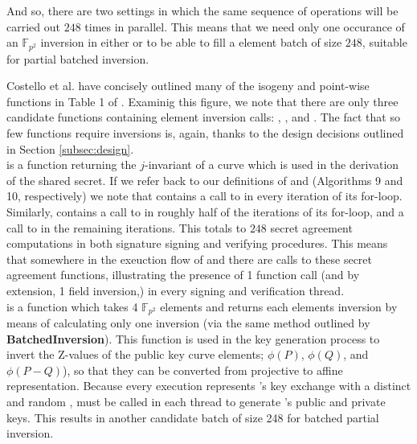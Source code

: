 And so, there are two settings in which the same sequence of operations will be carried out $248$ times in parallel. This means that we need only one occurance of an $\mathbb{F}_{p^2}$ inversion in either  or  to be able to fill a element batch of size $248$, suitable for partial batched inversion.

Costello et al. have concisely outlined many of the \sidh isogeny and point-wise functions in Table 1 of \cite{effalg}. Examinig this figure, we note that there are only three candidate functions containing element inversion calls: , , and . The fact that so few functions require inversions is, again, thanks to the design decisions outlined in Section \ref{subsec:design}.\\

\noindent
{} is a function returning the $j$-invariant of a curve which is used in the derivation of the shared secret. If we refer back to our definitions of  and  (Algorithms 9 and 10, respectively) we note that  contains a call to  in every iteration of its for-loop. Similarly,  contains a call to  in roughly half of the iterations of its for-loop, and a call to  in the remaining iterations. This totals to $248$ secret agreement computations in both signature signing and verifying procedures. This means that somewhere in the exeuction flow of  and  there are calls to these secret agreement functions, illustrating the presence of 1  function call (and by extension, 1 field inversion,) in every signing and verification thread.\\

\noindent
{} is a function which takes 4 $\mathbb{F}_{p^2}$ elements and returns each elements inversion by means of calculating only one inversion (via the same method outlined by \textbf{BatchedInversion}). This function is used in the key generation process to invert the Z-values of the public key curve elements; $\phi(P)$, $\phi(Q)$, and $\phi(P-Q)$), so that they can be converted from projective to affine representation. Because every  execution represents \bob's key exchange with a distinct and random \randall,  must be called in each thread to generate \randall's public and private keys. This results in another candidate batch of size 248 for batched partial inversion.\\

